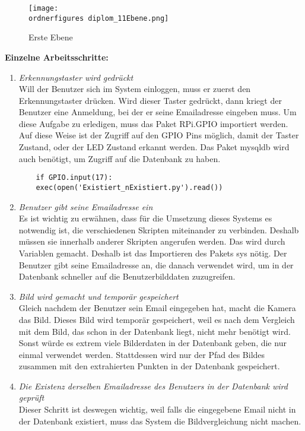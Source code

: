 \begin{figure}[H]
	\texttt{[image: \\ordnerfigures diplom\_11Ebene.png]}
	\caption{Erste Ebene}
	\label{fig:Erste Ebene}
\end{figure}
\textbf{Einzelne Arbeitsschritte: } \\
\begin{enumerate}
	\item \textit{Erkennungstaster wird gedr{\"u}ckt} \\
	Will der Benutzer sich im System einloggen, muss er zuerst den Erkennungstaster dr{\"u}cken. Wird dieser Taster gedr{\"u}ckt, dann kriegt der Benutzer eine Anmeldung, bei der er seine Emailadresse eingeben muss. Um diese Aufgabe zu erledigen, muss das Paket RPi.GPIO importiert werden. Auf diese Weise ist der Zugriff auf den GPIO Pins m{\"o}glich, damit der Taster Zustand, oder der LED Zustand erkannt werden. Das Paket mysqldb wird auch ben{\"o}tigt, um Zugriff auf die Datenbank zu haben.
	\begin{lstlisting}
	if GPIO.input(17):
	exec(open('Existiert_nExistiert.py').read()) 
	\end{lstlisting} 
	\item \textit{Benutzer gibt seine Emailadresse ein} \\
	Es ist wichtig zu erw{\"a}hnen, dass für die Umsetzung dieses Systems es notwendig ist, die verschiedenen Skripten miteinander zu verbinden.  Deshalb müssen sie innerhalb anderer Skripten angerufen werden. Das wird durch Variablen gemacht. Deshalb ist das Importieren des Pakets sys n{\"o}tig.
	Der Benutzer gibt seine Emailadresse an, die danach verwendet wird, um in der Datenbank schneller auf die Benutzerbilddaten zuzugreifen.
	\item \textit{Bild wird gemacht und tempor{\"a}r gespeichert} \\
	Gleich nachdem der Benutzer sein Email eingegeben hat, macht die Kamera das Bild. Dieses Bild wird tempor{\"a}r gespeichert, weil es nach dem Vergleich mit dem Bild, das schon in der Datenbank liegt, nicht mehr benötigt wird. Sonst w{\"u}rde es extrem viele Bilderdaten in der Datenbank geben, die nur einmal verwendet werden. Stattdessen wird nur der Pfad des Bildes zusammen mit den extrahierten Punkten in der Datenbank gespeichert.
	\item \textit{Die Existenz derselben Emailadresse des Benutzers in der Datenbank wird geprüft} \\
		Dieser Schritt ist deswegen wichtig, weil falls die eingegebene Email nicht in der Datenbank existiert, muss das System die Bildvergleichung nicht machen. 

\end{enumerate}
